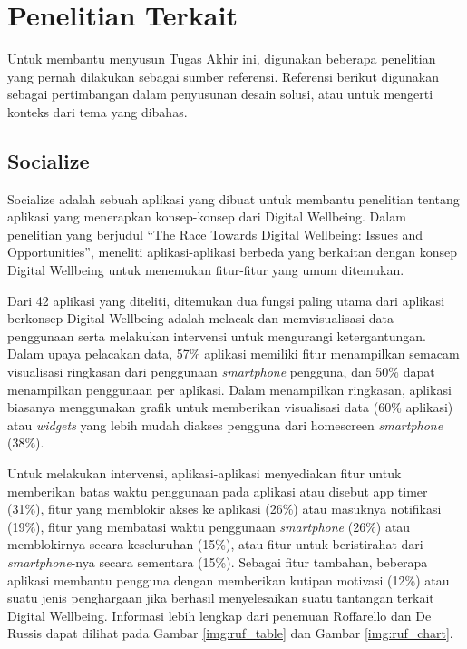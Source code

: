 \justifying
\FloatBarrier


\section{Penelitian Terkait}
\label{sec:penelitian_terkait}

Untuk membantu menyusun Tugas Akhir ini, digunakan beberapa penelitian yang pernah dilakukan sebagai sumber referensi. Referensi berikut digunakan sebagai pertimbangan dalam penyusunan desain solusi, atau untuk mengerti konteks dari tema yang dibahas.

\subsection{Socialize}

Socialize adalah sebuah aplikasi yang dibuat untuk membantu penelitian tentang aplikasi yang menerapkan konsep-konsep dari Digital Wellbeing. Dalam penelitian yang berjudul “The Race Towards Digital Wellbeing: Issues and Opportunities”, \textcite{CHI2019SOCIALIZE} meneliti aplikasi-aplikasi berbeda yang berkaitan dengan konsep Digital Wellbeing untuk menemukan fitur-fitur yang umum ditemukan.

Dari 42 aplikasi yang diteliti, ditemukan dua fungsi paling utama dari aplikasi berkonsep Digital Wellbeing adalah melacak dan memvisualisasi data penggunaan serta melakukan intervensi untuk mengurangi ketergantungan. Dalam upaya pelacakan data, 57\% aplikasi memiliki fitur menampilkan semacam visualisasi ringkasan dari penggunaan \textit{smartphone} pengguna, dan 50\% dapat menampilkan penggunaan per aplikasi. Dalam menampilkan ringkasan, aplikasi biasanya menggunakan grafik untuk memberikan visualisasi data (60\% aplikasi) atau \textit{widgets} yang lebih mudah diakses pengguna dari homescreen \textit{smartphone} (38\%).

Untuk melakukan intervensi, aplikasi-aplikasi menyediakan fitur untuk memberikan batas waktu penggunaan pada aplikasi atau disebut app timer (31\%), fitur yang memblokir akses ke aplikasi (26\%) atau masuknya notifikasi (19\%), fitur yang membatasi waktu penggunaan \textit{smartphone} (26\%) atau memblokirnya secara keseluruhan (15\%), atau fitur untuk beristirahat dari \textit{smartphone}-nya secara sementara (15\%). Sebagai fitur tambahan, beberapa aplikasi membantu pengguna dengan memberikan kutipan motivasi (12\%) atau suatu jenis penghargaan jika berhasil menyelesaikan suatu tantangan terkait Digital Wellbeing. Informasi lebih lengkap dari penemuan Roffarello dan De Russis dapat dilihat pada Gambar \ref{img:ruf_table} dan Gambar \ref{img:ruf_chart}.

